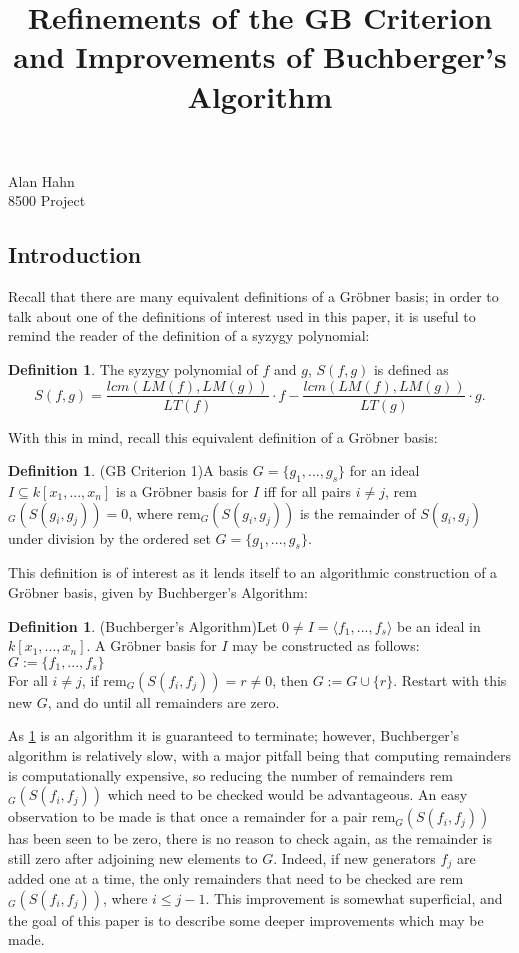 \documentclass[reqno]{amsart}
\theoremstyle{definition}
\theoremstyle{definition}
\newtheorem{defn}[lem]{Definition}
\begin{document}
\noindent
Alan Hahn
\\8500 Project
\vspace{7mm}
\title{Refinements of the GB Criterion and Improvements of Buchberger's Algorithm}
\maketitle



\subsection{Introduction}\label{Intro} 
Recall that there are many equivalent definitions of a Gr{\"o}bner basis; in order to talk about one of the definitions of interest used in this paper, it is useful to remind the reader of the definition of a syzygy polynomial:  

\begin{defn} The syzygy polynomial of $f$ and $g$, $S(f,g)$ is defined as
$$S(f,g) = \frac{lcm(LM(f),LM(g))}{LT(f)}\cdot f - \frac{lcm(LM(f),LM(g))}{LT(g)}\cdot g.$$
\end{defn}
With this in mind, recall this equivalent definition of a Gr{\"o}bner basis:
\begin{defn}{(GB Criterion 1)}\label{gbc1}
A basis $G = \{g_1,...,g_s\}$ for an ideal $I \subseteq k[x_1,...,x_n]$ is a Gr{\"o}bner basis for $I$ iff for all pairs $i\neq j$, rem$_G(S(g_i,g_j)) = 0$, where rem$_G(S(g_i,g_j))$ is the remainder of $S(g_i,g_j)$ under division by the ordered set $G = \{g_1,...,g_s\}$. 
\end{defn}


This definition is of interest as it lends itself to an algorithmic construction of a Gr{\"o}bner basis, given by Buchberger's Algorithm: 

\begin{defn}{(Buchberger's Algorithm)}\label{BA}
Let $0\neq I = \langle f_1,...,f_s\rangle$ be an ideal in $k[x_1,...,x_n]$. A Gr{\"o}bner basis for $I$ may be constructed as follows: 
\\$G := \{f_1,...,f_s\}$
\\For all $i\neq j$, if rem$_G(S(f_i,f_j)) = r \neq 0$, then $G := G\cup \{r\}$. 
Restart with this new $G$, and do until all remainders are zero. 
\end{defn}

As \ref{BA} is an algorithm it is guaranteed to terminate; however, Buchberger's algorithm is relatively slow, with a major pitfall being that computing remainders is computationally expensive, so reducing the number of remainders rem$_G(S(f_i,f_j))$ which need to be checked would be advantageous. An easy observation to be made is that once a remainder for a pair rem$_G(S(f_i,f_j))$ has been seen to be zero, there is no reason to check again, as the remainder is still zero after adjoining new elements to $G$. Indeed, if new generators $f_j$ are added one at a time, the only remainders that need to be checked are  rem$_G(S(f_i,f_j))$, where $i \leq j - 1$. This improvement is somewhat superficial, and the goal of this paper is to describe some deeper improvements which may be made. 
\end{document}
